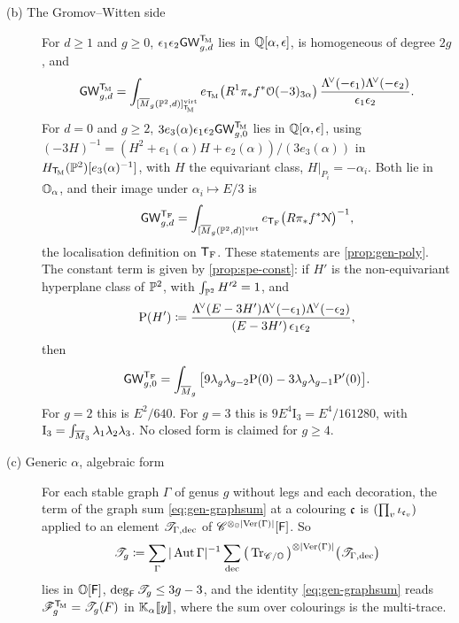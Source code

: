 \begin{thm}[Specialisation]
\begin{description}
\item[(b) The Gromov--Witten side] For $d\geq 1$ and $g\geq 0$, $\epsilon_1\epsilon_2\mathsf{GW}_{g,d}^{\mathsf{T}_{\!\mathrm{M}}}$ lies in $\mathbb{Q}[\alpha,\epsilon]$, is homogeneous of degree $2g$, and
\[
\mathsf{GW}_{g,d}^{\mathsf{T}_{\!\mathrm{M}}}=\int_{[\overline{M}_g(\mathbb{P}^2,d)]^{\mathrm{virt}}_{\mathsf{T}_{\!\mathrm{M}}}}e_{\mathsf{T}_{\!\mathrm{M}}}\big(R^1\pi_*f^*\mathcal{O}(-3)_{3\alpha}\big)\,\frac{\Lambda^{\!\vee}(-\epsilon_1)\Lambda^{\!\vee}(-\epsilon_2)}{\epsilon_1\epsilon_2}.
\]
For $d=0$ and $g\geq 2$, $3e_3(\alpha)\epsilon_1\epsilon_2\mathsf{GW}_{g,0}^{\mathsf{T}_{\!\mathrm{M}}}$ lies in $\mathbb{Q}[\alpha,\epsilon]$, using $(-3H)^{-1}=(H^2+e_1(\alpha)H+e_2(\alpha))/(3e_3(\alpha))$ in $H_{\mathsf{T}_{\!\mathrm{M}}}(\mathbb{P}^2)[e_3(\alpha)^{-1}]$, with $H$ the equivariant class, $H|_{P_i}=-\alpha_i$. Both lie in $\mathbb{O}_{\alpha}$, and their image under $\alpha_i\mapsto E/3$ is
\[
\mathsf{GW}_{g,d}^{\mathsf{T}_{\mathrm{F}}}=\int_{[\overline{M}_g(\mathbb{P}^2,d)]^{\mathrm{virt}}}e_{\mathsf{T}_{\mathrm{F}}}\big(R\pi_*f^*\mathcal{N}\big)^{-1},
\]
the localisation definition on $\mathsf{T}_{\mathrm{F}}$. These statements are \cref{prop:gen-poly}. The constant term is given by \cref{prop:spe-const}: if $H'$ is the non-equivariant hyperplane class of $\mathbb{P}^2$, with $\int_{\mathbb{P}^2}H'^2=1$, and
\[
\mathrm{P}(H')\coloneqq\frac{\Lambda^{\!\vee}(E-3H')\Lambda^{\!\vee}(-\epsilon_1)\Lambda^{\!\vee}(-\epsilon_2)}{(E-3H')\,\epsilon_1\epsilon_2},
\]
then
\[
\mathsf{GW}_{g,0}^{\mathsf{T}_{\mathrm{F}}}=\int_{\overline{M}_g}\big[9\lambda_g\lambda_{g-2}\mathrm{P}(0)-3\lambda_g\lambda_{g-1}\mathrm{P}'(0)\big].
\]
For $g=2$ this is $E^2/640$. For $g=3$ this is $9E^4\mathrm{I}_3=E^4/161280$, with $\mathrm{I}_3=\int_{\overline{M}_3}\lambda_1\lambda_2\lambda_3$. No closed form is claimed for $g\geq 4$.

\item[(c) Generic $\alpha$, algebraic form] For each stable graph $\Gamma$ of genus $g$ without legs and each decoration, the term of the graph sum \eqref{eq:gen-graphsum} at a colouring $\mathfrak{c}$ is $(\prod_v\iota_{\mathfrak{c}_v})$ applied to an element $\mathscr{T}_{\Gamma,\mathrm{dec}}$ of $\mathscr{C}^{\otimes_{\mathbb{O}}|\mathrm{Ver}(\Gamma)|}[\mathsf{F}]$. So
\[
\mathscr{T}_g\coloneqq\sum_\Gamma|\operatorname{Aut}\Gamma|^{-1}\sum_{\mathrm{dec}}\big(\operatorname{Tr}_{\mathscr{C}/\mathbb{O}}\big)^{\otimes|\mathrm{Ver}(\Gamma)|}\big(\mathscr{T}_{\Gamma,\mathrm{dec}}\big)
\]
lies in $\mathbb{O}[\mathsf{F}]$, $\deg_{\mathsf{F}}\mathscr{T}_g\leq 3g-3$, and the identity \eqref{eq:gen-graphsum} reads $\mathscr{F}_g^{\mathsf{T}_{\!\mathrm{M}}}=\mathscr{T}_g(F)$ in $\mathbb{K}_{\alpha}[\![ y ]\!]$, where the sum over colourings is the multi-trace.


\end{description}
\end{thm}
